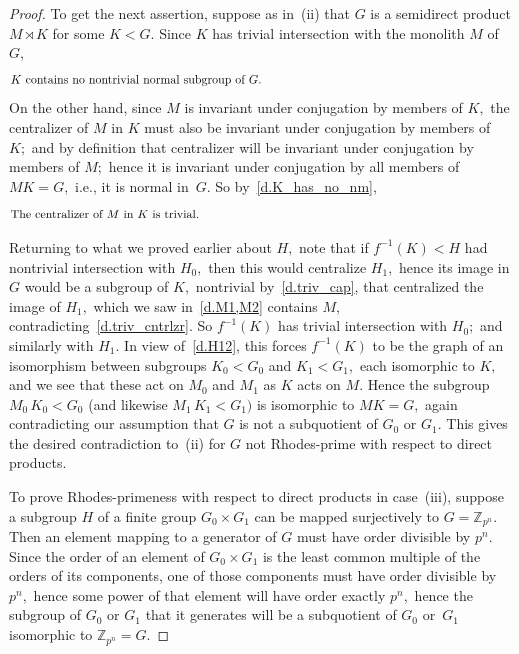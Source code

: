 \documentclass{amsart}
\numberwithin{equation}{section}
\numberwithin{theorem}{section}
\newcommand{\Z}{\mathbb{Z}}
\begin{document}
\begin{proof}
To get the next assertion, suppose as in~(ii)
that $G$ is a semidirect product $M\rtimes K$ for some $K<G.$
Since $K$ has trivial intersection with the monolith $M$ of $G,$
%
\begin{equation}\begin{minipage}[c]{35pc}\label{d.K_has_no_nm}
$K$ contains no nontrivial normal subgroup of~$G.$
\end{minipage}\end{equation}
%
On the other hand, since $M$ is invariant under conjugation by
members of $K,$ the centralizer of $M$ in $K$ must also be invariant
under conjugation by members of $K;$ and by definition that
centralizer will be invariant under conjugation by members of $M;$
hence it is invariant under conjugation by
all members of $MK=G,$ i.e., it is normal in~$G.$
So by~\eqref{d.K_has_no_nm},
%
\begin{equation}\begin{minipage}[c]{35pc}\label{d.triv_cntrlzr}
The centralizer of $M$ in $K$ is trivial.
\end{minipage}\end{equation}

Returning to what we proved earlier about $H,$ note that
if $f^{-1}(K) < H$ had nontrivial intersection with
$H_0,$ then this would centralize $H_1,$ hence its image
in $G$ would be a subgroup of $K,$ nontrivial by~\eqref{d.triv_cap},
that centralized the image of $H_1,$ which we saw in~\eqref{d.M1,M2}
contains $M,$ contradicting~\eqref{d.triv_cntrlzr}.
So $f^{-1}(K)$ has trivial intersection with $H_0;$ and
similarly with $H_1.$
In view of~\eqref{d.H12}, this
forces $f^{-1}(K)$ to be the graph of an isomorphism between subgroups
$K_0 < G_0$ and $K_1 < G_1,$ each isomorphic to $K,$ and we see
that these act on $M_0$ and $M_1$ as $K$ acts on $M.$
Hence the
subgroup $M_0\,K_0 < G_0$ (and likewise $M_1\,K_1 < G_1)$ is isomorphic
to $MK = G,$ again contradicting our assumption that $G$ is not
a subquotient of $G_0$ or $G_1.$
This gives the desired contradiction to~(ii) for
$G$ not Rhodes-prime with respect to direct products.

To prove Rhodes-primeness with respect to direct products
in case~(iii), suppose a subgroup $H$ of a finite group $G_0\times G_1$
can be mapped surjectively to $G=\Z_{p^n}.$
Then an element mapping to a generator of $G$ must
have order divisible by $p^n.$
Since the order of an element of $G_0\times G_1$ is the least
common multiple of the orders of its components, one of those
components must have order divisible by $p^n,$
hence some power of that element will have order exactly $p^n,$
hence the subgroup of $G_0$ or $G_1$ that it generates will
be a subquotient of $G_0$ or~$G_1$ isomorphic to $\Z_{p^n}=G.$
\end{proof}
\end{document}
